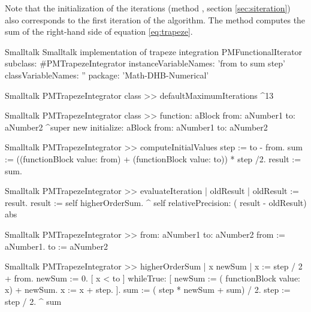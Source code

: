 Note that the initialization of the iterations (method , \cf section \ref{sec:siteration}) also corresponds to the first iteration of the algorithm.
The method  computes the sum of the right-hand side of equation \ref{eq:trapeze}.

\begin{listing}[label=lst:trapeze]{Smalltalk}
{Smalltalk implementation of trapeze integration}
PMFunctionalIterator subclass: #PMTrapezeIntegrator
   instanceVariableNames: 'from to sum step'
   classVariableNames: ''
   package: 'Math-DHB-Numerical'
\end{listing}

\begin{displaycode}{Smalltalk}
PMTrapezeIntegrator class >> defaultMaximumIterations
    ^13
\end{displaycode}

\begin{displaycode}{Smalltalk}
PMTrapezeIntegrator class >> function: aBlock from: aNumber1 to: aNumber2
    ^super new initialize: aBlock from: aNumber1 to: aNumber2
\end{displaycode}

\begin{displaycode}{Smalltalk}
PMTrapezeIntegrator >> computeInitialValues
    step := to - from.
    sum := ((functionBlock value: from) + (functionBlock value: to)) * step /2.
    result := sum.
\end{displaycode}

\begin{displaycode}{Smalltalk}
PMTrapezeIntegrator >> evaluateIteration
    | oldResult |
    oldResult := result.
    result := self higherOrderSum.
    ^ self relativePrecision: ( result - oldResult) abs
\end{displaycode}

\begin{displaycode}{Smalltalk}
PMTrapezeIntegrator >> from: aNumber1 to: aNumber2
    from := aNumber1.
    to := aNumber2
\end{displaycode}

\begin{displaycode}{Smalltalk}
PMTrapezeIntegrator >> higherOrderSum
    | x newSum |
    x := step / 2 + from.
    newSum := 0.
    [ x < to ]
        whileTrue: [ newSum := ( functionBlock value: x) + newSum.
                     x := x + step.
                   ].
    sum := ( step * newSum + sum) / 2.
    step := step / 2.
    ^ sum
\end{displaycode}

